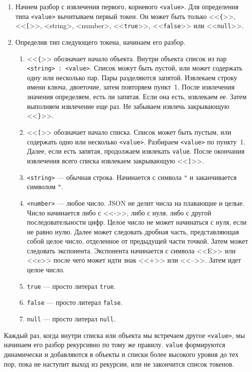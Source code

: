 \documentclass[a4paper, a4paper]{article}
\begin{document}
\begin{enumerate}
  \item Начнем разбор с извлечения первого, корневого \texttt{<value>}. Для
        определения типа \texttt{<value>} вычитываем первый токен. Он может
        быть только <<\texttt{\{}>>, <<\texttt{[}>>, <string>, <number>,
        <<\texttt{true}>>, <<\texttt{false}>> или <<\texttt{null}>>.
  \item Определив тип следующего токена, начинаем его разбор.
        \begin{enumerate}
          \item <<\texttt{\{}>> обозначает начало объекта. Внутри объекта список
                из пар \texttt{<string> : <value>}. Список можут быть пустой,
                или может содержать одну или несколько пар. Пары разделяются
                запятой. Извлекаем строку имени ключа, двоеточие, затем повторяем
                пункт~1. После извлечения значения определяем, есть ли запятая.
                Если она есть, извлекаем ее. Затем выполняем извлечение еще раз.
                Не забываем извлечь закрывающую <<\texttt{\}}>>.
          \item <<\texttt{[}>> обозначает начало списка. Список может быть пустым,
                или содержать одно или несколько \texttt{<value>}. Разбираем
                \texttt{<value>} по пункту~1. Далее, если есть запятая, продолжаем
                извлекать \texttt{value}. После окончания извлечения всего списка
                извлекаем закрывающую <<\texttt{]}>>.
          \item \texttt{<string>} --- обычная строка. Начинается с символа \verb!"!
                и заканчивается символом \verb!"!.
          \item \texttt{<number>} --- любое число. JSON не делит числа на
                плавающие и целые. Число начинается либо с <<->>, либо с нуля,
                либо с другой последовательности цифр. Целое число не может
                начинаться с нуля, если не равно нулю. Далее может следовать
                дробная часть, представляющая собой целое число, отделенное от
                предыдущей части точкой. Затем может следовать экспонента.
                Экспонента начинается с символа <<E>> или <<e>> после чего
                может идти знак <<+>> или <<-->>. Затем идет целое число.
          \item \texttt{true} --- просто литерал \texttt{true}.
          \item \texttt{false} --- просто литерал \texttt{false}.
          \item \texttt{null} --- просто литерал \texttt{null}.
        \end{enumerate}
    \end{enumerate}

Каждый раз, когда внутри списка или объекта мы встречаем другое \texttt{<value>},
мы начинаем его разбор рекурсивно по тому же правилу. \texttt{value} формируются
динамически и добавляются в объекты и списки более высокого уровня до тех пор,
пока не наступит выход из рекурсии, или не закончится список токенов.
\end{document}
